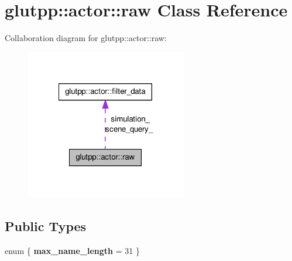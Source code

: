 \hypertarget{classglutpp_1_1actor_1_1raw}{\section{glutpp\-:\-:actor\-:\-:raw \-Class \-Reference}
\label{classglutpp_1_1actor_1_1raw}
}


\-Collaboration diagram for glutpp\-:\-:actor\-:\-:raw\-:
\nopagebreak
\begin{figure}[H]
\begin{center}
\leavevmode
\includegraphics[width=200pt]{classglutpp_1_1actor_1_1raw__coll__graph}
\end{center}
\end{figure}
\subsection*{\-Public \-Types}
\begin{DoxyCompactItemize}
\item 
enum \{ {\bfseries max\-\_\-name\-\_\-length} =  31
 \}
\end{DoxyCompactItemize}
